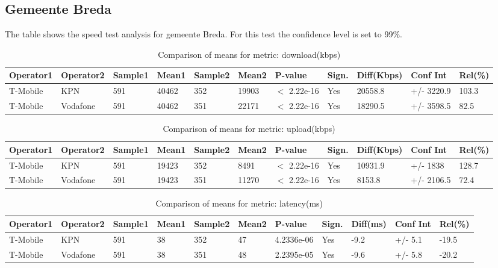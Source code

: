 \documentclass[]{article}
\begin{document}
\normalsize

\newpage

\subsection{Gemeente Breda}\label{gemeente-breda}

The table shows the speed test analysis for gemeente Breda. For this
test the confidence level is set to 99\%.

\begin{table}[ht]
\centering
{\footnotesize
\begin{tabular}{lllllllllll}
  \hline
Operator1 & Operator2 & Sample1 & Mean1 & Sample2 & Mean2 & P-value & Sign. & Diff(Kbps) & Conf Int & Rel(\%) \\ 
  \hline
T-Mobile & KPN & 591 & 40462 & 352 & 19903 & $<$ 2.22e-16 & Yes & 20558.8 & +/- 3220.9 & 103.3 \\ 
  T-Mobile & Vodafone & 591 & 40462 & 351 & 22171 & $<$ 2.22e-16 & Yes & 18290.5 & +/- 3598.5 & 82.5 \\ 
   \hline
\end{tabular}
}
\caption{Comparison of means for metric: download(kbps)} 
\end{table}

\begin{table}[ht]
\centering
{\footnotesize
\begin{tabular}{lllllllllll}
  \hline
Operator1 & Operator2 & Sample1 & Mean1 & Sample2 & Mean2 & P-value & Sign. & Diff(Kbps) & Conf Int & Rel(\%) \\ 
  \hline
T-Mobile & KPN & 591 & 19423 & 352 & 8491 & $<$ 2.22e-16 & Yes & 10931.9 & +/- 1838 & 128.7 \\ 
  T-Mobile & Vodafone & 591 & 19423 & 351 & 11270 & $<$ 2.22e-16 & Yes & 8153.8 & +/- 2106.5 & 72.4 \\ 
   \hline
\end{tabular}
}
\caption{Comparison of means for metric: upload(kbps)} 
\end{table}

\begin{table}[ht]
\centering
{\footnotesize
\begin{tabular}{lllllllllll}
  \hline
Operator1 & Operator2 & Sample1 & Mean1 & Sample2 & Mean2 & P-value & Sign. & Diff(ms) & Conf Int & Rel(\%) \\ 
  \hline
T-Mobile & KPN & 591 & 38 & 352 & 47 & 4.2336e-06 & Yes & -9.2 & +/- 5.1 & -19.5 \\ 
  T-Mobile & Vodafone & 591 & 38 & 351 & 48 & 2.2395e-05 & Yes & -9.6 & +/- 5.8 & -20.2 \\ 
   \hline
\end{tabular}
}
\caption{Comparison of means for metric: latency(ms)} 
\end{table}
\end{document}
